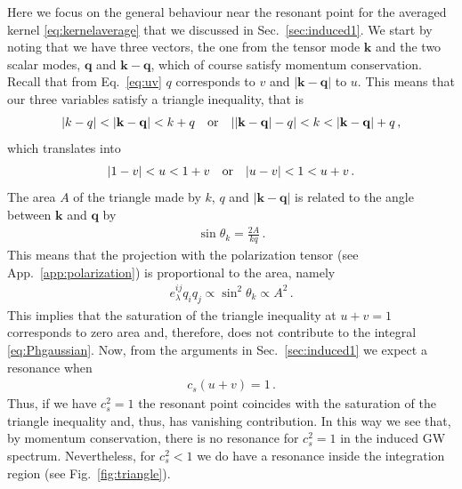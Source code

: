 \documentclass[a4paper,11pt]{article}
\numberwithin{equation}{section}
\begin{document}
Here we focus on the general behaviour near the resonant point for the averaged kernel \eqref{eq:kernelaverage} that we discussed in  Sec.~\ref{sec:induced1}. We start by noting that we have three vectors, the one from the tensor mode $\mathbf{k}$ and the two scalar modes, $\mathbf{q}$ and $\mathbf{k}-\mathbf{q}$, which of course satisfy momentum conservation. Recall that from Eq.~\eqref{eq:uv} $q$ corresponds to $v$ and $|\mathbf{k}-\mathbf{q}|$ to $u$. This means that our three variables satisfy a triangle inequality, that is
\begin{align}
|k-q|<|\mathbf{k}-\mathbf{q}|<k+q\quad{\rm or}\quad ||\mathbf{k}-\mathbf{q}|-q|<k<|\mathbf{k}-\mathbf{q}|+q\,,
\end{align}
which translates into
\begin{align}
|1-v|<u<1+v \quad {\rm or}\quad |u-v|<1<u+v\,.
\end{align}
The area $A$ of the triangle made by $k$, $q$ and $|\mathbf{k}-\mathbf{q}|$ is related to the angle between $\mathbf{k}$ and $\mathbf{q}$ by
\begin{align}
\sin \theta_k=\frac{2A}{kq}\,.
\end{align}
This means that the projection with the polarization tensor (see App.~\ref{app:polarization}) is proportional to the area, namely
\begin{align}
e^{ij}_\lambda q_iq_j\propto\sin^2\theta_k\propto A^2\,.
\end{align}
This implies that the saturation of the triangle inequality at $u+v=1$ corresponds to zero area and, therefore, does not contribute to the integral \eqref{eq:Phgaussian}. Now, from the arguments in Sec.~\ref{sec:induced1} we expect a resonance when 
\begin{align}
c_s(u+v)=1\,.
\end{align}
Thus, if we have $c_s^2=1$ the resonant point coincides with the saturation of the triangle inequality and, thus, has vanishing contribution. In this way we see that, by momentum conservation, there is no resonance for $c_s^2=1$ in the induced GW spectrum. Nevertheless, for $c^2_s<1$ we do have a resonance inside the integration region (see Fig.~\ref{fig:triangle}).
\end{document}
